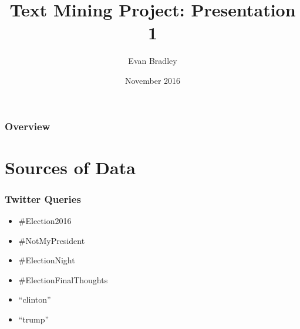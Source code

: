 \documentclass{beamer}
\title[Bank Marketing Project]{Text Mining Project: Presentation 1} %
\author{Evan Bradley} %
\institute[OU] %
{
Oakland University \\ %
\medskip
\textit{edbradley@oakland.edu} %
}
\date{November 2016} %
\begin{document}
\begin{frame}
	\frametitle{\space}
	\titlepage %
\end{frame}

\begin{frame}
\frametitle{Overview} %
\tableofcontents %
\end{frame}


\section{Sources of Data} %




\begin{frame}
	\frametitle{Twitter Queries}
	\begin{itemize}
		\item \#Election2016 
		\newline
		\item \#NotMyPresident
		\newline
		\item \#ElectionNight
		\newline
		\item \#ElectionFinalThoughts
		\newline
		\item ``clinton''
		\newline
		\item ``trump'' 
		\newline
	\end{itemize}
\end{frame}
\end{document}
